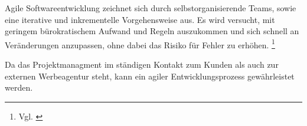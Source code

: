 Agile Softwareentwicklung zeichnet sich durch selbstorganisierende Teams, sowie eine iterative
und inkrementelle Vorgehensweise aus. Es wird versucht, mit geringem
bürokratischem Aufwand und Regeln auszukommen und sich schnell an Veränderungen anzupassen,
ohne dabei das Risiko für Fehler zu erhöhen. \footnote{Vgl. \cite{wiki:Agile_Softwareentwicklung}}


Da das Projektmanagment im ständigen Kontakt zum Kunden als auch zur externen
Werbeagentur steht, kann ein agiler Entwicklungsprozess gewährleistet werden.
